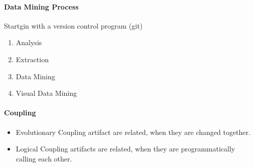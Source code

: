 \documentclass[ngerman]{scrartcl}
\begin{document}
\paragraph{Data Mining Process}
Startgin with a version control program (git)
\begin{enumerate}
  \item Analysis
  \item Extraction
  \item Data Mining
  \item Visual Data Mining
\end{enumerate} 



\paragraph{Coupling}
\begin{itemize}
  \item Evolutionary Coupling artifact are related, when they are changed together.
  \item Logical Coupling artifacts are related, when they are programmatically calling each other.
\end{itemize}
\end{document}
